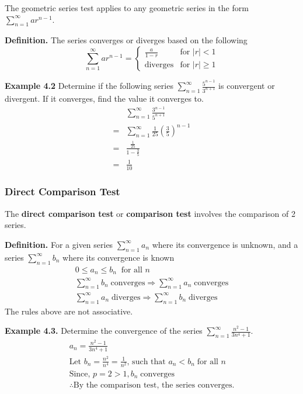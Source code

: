 \documentclass[12pt]{article}
\begin{document}
The geometric series test applies to any geometric series in the form $\displaystyle\sum_{n=1}^{\infty}ar^{n-1}$.

\textbf{Definition.} The series converges or diverges based on the following
\[
	\displaystyle\sum_{n=1}^{\infty}ar^{n-1} =
	\begin{cases}
		\displaystyle\frac{a}{1-r} & \text{for } |r| < 1    \\
		\text{diverges}            & \text{for } |r| \geq 1
	\end{cases}
\]

\textbf{Example 4.2} Determine if the following series $\displaystyle\sum_{n=1}^{\infty}\frac{5^{n-1}}{3^{n+1}}$ is convergent or divergent. If it converges, find the value it converges to.
\begin{align*}
	  & \displaystyle\sum_{n=1}^{\infty}\frac{3^{n-1}}{5^{n+1}}                    \\
	= & \displaystyle\sum_{n=1}^{\infty}\frac{1}{25}\left(\frac{3}{5}\right)^{n-1} \\
	= & \frac{\frac{1}{25}}{1-\frac{3}{5}}                                         \\
	= & \frac{1}{10}
\end{align*}

\subsubsection{Direct Comparison Test}

The \textbf{direct comparison test} or \textbf{comparison test} involves the comparison of 2 series.

\textbf{Definition.} For a given series $\displaystyle\sum_{n=1}^{\infty}a_n$ where its convergence is unknown, and a series $\displaystyle\sum_{n=1}^{\infty}b_n$ where its convergence is known
\begin{gather*}
	0 \leq a_n \leq b_n \;\; 	\text{for all } n \\
	\displaystyle\sum_{n=1}^{\infty}b_n  \; \text{converges} \Rightarrow \displaystyle\sum_{n=1}^{\infty}a_n \; \text{converges}  \\
	\displaystyle\sum_{n=1}^{\infty}a_n  \; \text{diverges} \Rightarrow \displaystyle\sum_{n=1}^{\infty}b_n \; \text{diverges}
\end{gather*}
The rules above are not associative.

\textbf{Example 4.3.} Determine the convergence of the series $\displaystyle\sum_{n=1}^{\infty}\frac{n^2-1}{3n^4+1}$.
\begin{gather*}
	a_n = \frac{n^2-1}{3n^4+1} \\
	\text{Let } b_n = \frac{n^2}{n^4} = \frac{1}{n^2} \text{, such that } a_n < b_n \; \text{for all } n \\
	\text{Since, } p = 2 > 1, b_n \; \text{converges} \\
	\therefore \text{By the comparison test, the series converges.}
\end{gather*}
\end{document}
